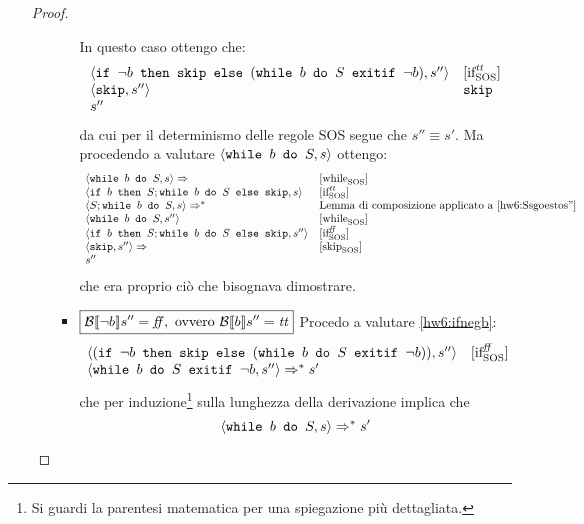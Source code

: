 \begin{enumerate}
\begin{proof}
\begin{itemize}
\begin{itemize}
		In questo caso ottengo che:
		$$
		\begin{array}{ll}
		\confSs{\ifABC{\neg b}{\skipForFriends}{(\wbSE{b}{S}{\neg b})}}{s''} & \ifttSOS \\
		\confSs{\skipForFriends}{s''} & \skipForFriends \\
		s''
		\end{array}
		$$
		da cui per il determinismo delle regole SOS segue che $\boxed{s'' \equiv s'}$. Ma procedendo
		a valutare $\confSs{\wbS{b}{S}}{s}$ ottengo:
		$$
		\begin{array}{ll}
		\confSs{\wbS{b}{S}}{s} \Rar{} & \whileSOS \\
		\confSs{\ifABC{b}{S; \wbS{b}{S}}{\skipForFriends}}{s} & \ifttSOS \\
		\confSs{S; \wbS{b}{S}}{s} \Rar{*} & \text{Lemma di composizione applicato a \ref{hw6:Ssgoestos''}} \\
		\confSs{\wbS{b}{S}}{s''} & \whileSOS \\
		\confSs{\ifABC{b}{S; \wbS{b}{S}}{\skipForFriends}}{s''} & \ifffSOS \\
		\confSs{\skipForFriends}{s''} \Rar{} & \skipSOS \\
		s''
		\end{array}
		$$
		che era proprio ciò che bisognava dimostrare.
		\item $\boxed{\B{\neg b}'' = \semfalse, \text{ ovvero } \B{b}'' = \semtrue}$
		Procedo a valutare \ref{hw6:ifnegb}:
		$$
		\begin{array}{ll}
		\confSs{(\ifABC{\neg b}{\skipForFriends}{(\wbSE{b}{S}{\neg b})})}{s''} & \ifffSOS\\
		\confSs{\wbSE{b}{S}{\neg b}}{s''} \Rar{*} s'
		\end{array}
		$$
		che per induzione\footnote{Si guardi la parentesi matematica per una spiegazione più dettagliata.} sulla lunghezza della derivazione implica che
		$$
		\confSs{\wbS{b}{S}}{s} \Rar{*} s'
		$$
	\end{itemize}
	

\end{itemize}
\end{proof}
\end{enumerate}
